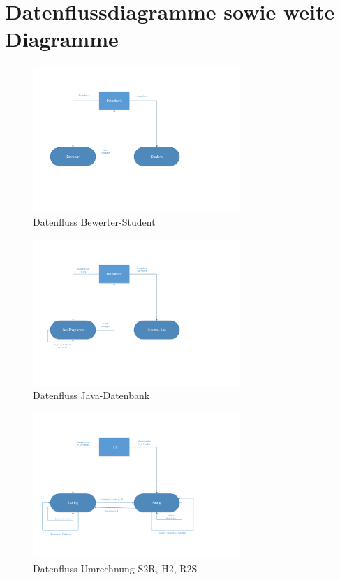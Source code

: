 \documentclass[a4paper,listof=leveldown,listof=numbered]{scrreprt}
\begin{document}
	\section{Datenflussdiagramme sowie weite Diagramme}
	\begin{figure}
		\centering
		\includegraphics[width=0.7\textwidth]{img/DTD_1_BewerterStudent.pdf}
		\caption{Datenfluss Bewerter-Student}
	\end{figure}
	\begin{figure}
		\centering
		\includegraphics[width=0.7\textwidth]{img/DTD_2_JavaDB.pdf}
		\caption{Datenfluss Java-Datenbank}
	\end{figure}
	\begin{figure}
		\centering
		\includegraphics[width=0.7\textwidth]{img/DTD_3_H2SR.pdf}
		\caption{Datenfluss Umrechnung S2R, H2, R2S}
	\end{figure}
\end{document}
